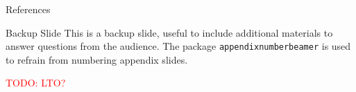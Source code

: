 \documentclass{beamer}
\newcommand{\todo}[1]{\textcolor{red}{TODO: #1}}
\begin{document}
\appendix

\begin{frame}{References}
    \nocite{*} %
    
    
\end{frame}


\begin{frame}{Backup Slide}
    This is a backup slide, useful to include additional materials to answer questions from the audience.
    \vfill
    The package \texttt{appendixnumberbeamer} is used to refrain from numbering appendix slides.

    \todo{LTO?}
\end{frame}

\end{document}
